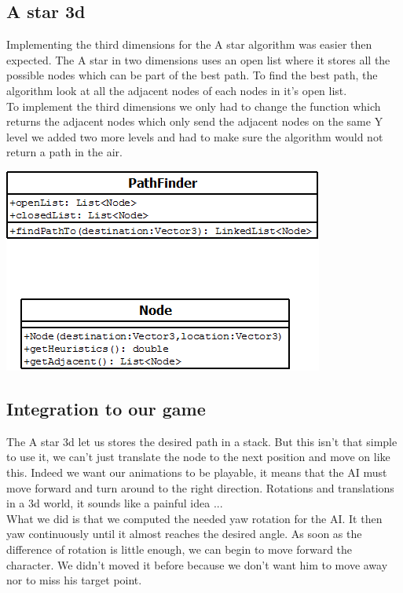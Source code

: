 \documentclass[article]{report}         %
\begin{document}
        \subsection{A star 3d}
          Implementing the third dimensions for the A star algorithm was easier then expected. The A star in two dimensions uses an open list where it stores all the possible nodes which can be part of the best path. To find the best path, the algorithm look at all the adjacent nodes of each nodes in it's open list.\\

          To implement the third dimensions we only had to change the function which returns the adjacent nodes which only send the adjacent nodes on the same Y level we added two more levels and had to make sure the algorithm would not return a  path in the air.
  \begin{center}
    \includegraphics{images/Astar.png}
  \end{center} 

\subsection{Integration to our game}
	The A star 3d let us stores the desired path in a stack. But this isn't that simple to use it, we can't just translate the node to the next position and move on like this. Indeed we want our animations to be playable, it means that the AI must move forward and turn around to the right direction. Rotations and translations in a 3d world, it sounds like a painful idea ...\\

What we did is that we computed the needed yaw rotation for the AI. It then yaw continuously until it almost reaches the desired angle. As soon as the difference of rotation is little enough, we can begin to move forward the character. We didn't moved it before because we don't want him to move away nor to miss his target point. 
\end{document}
